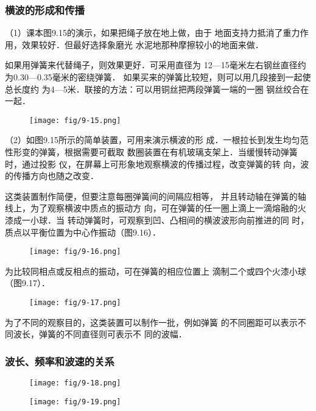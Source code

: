 \subsubsection{横波的形成和传播}
（1）课本图9.15的演示，如果把绳子放在地上做，由于
地面支持力抵消了重力作用，效果较好．但最好选择象磨光
水泥地那种摩擦较小的地面来做．

如果用弹簧来代替绳子，则效果更好．可采用直径为
12—15毫米左右钢丝直径约为0.30—0.35毫米的密绕弹簧．
如果买来的弹簧比较短，则可以用几段接到一起使总长度约
为4—5米．联接的方法：可以用铜丝把两段弹簧一端的一圈
钢丝绞合在一起．
\begin{figure}[htp]
    \centering
    \texttt{[image: fig/9-15.png]}
    \caption{}
\end{figure}

（2）如图9.15所示的简单装置，可用来演示横波的形
成．一根拉长到发生均匀范性形变的弹簧，根据需要可截取
数圈装置在有机玻璃支架上．当缓慢转动弹簧时，通过投影
仪，在屏幕上可形象地观察横波的传播过程，改变弹簧的转
向，波的传播方向也随之改变．

这类装置制作简便，但要注意每圈弹簧间的间隔应相等，
并且转动轴在弹簧的轴线上，为了观察横波中质点的振动方
向，可在弹簧的任一圈上滴上一滴熔融的火漆成一小球．当
转动弹簧时，可观察到凹、凸相间的横波波形向前推进的同
时，质点以平衡位置为中心作振动（图9.16）．

\begin{figure}[htp]
    \centering
    \texttt{[image: fig/9-16.png]}
    \caption{}
\end{figure}

为比较同相点或反相点的振动，可在弹簧的相应位置上
滴制二个或四个火漆小球（图9.17）．

\begin{figure}[htp]
    \centering
    \texttt{[image: fig/9-17.png]}
    \caption{}
\end{figure}

为了不同的观察目的，这类装置可以制作一批，例如弹簧
的不同圈距可以表示不同波长，弹簧的不同直径则可表示不
同的波幅．

\subsubsection{波长、频率和波速的关系}

\begin{figure}[htp]\centering
    \begin{minipage}[t]{0.48\textwidth}
    \centering
\texttt{[image: fig/9-18.png]}
    \caption{}
    \end{minipage}
    \begin{minipage}[t]{0.48\textwidth}
    \centering
\texttt{[image: fig/9-19.png]}
    \caption{}
    \end{minipage}
    \end{figure}

